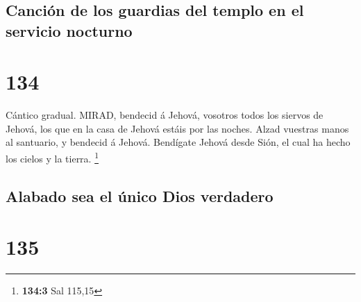 \hypertarget{canciuxf3n-de-los-guardias-del-templo-en-el-servicio-nocturno}{%
\subsection{Canción de los guardias del templo en el servicio
nocturno}\label{canciuxf3n-de-los-guardias-del-templo-en-el-servicio-nocturno}}

\hypertarget{section-133}{%
\section{134}\label{section-133}}

 Cántico gradual. MIRAD, bendecid á Jehová, vosotros todos
los siervos de Jehová, los que en la casa de Jehová estáis por las
noches.  Alzad vuestras manos al santuario, y bendecid á
Jehová.  Bendígate Jehová desde Sión, el cual ha hecho los
cielos y la tierra. \footnote{\textbf{134:3} Sal 115,15}

\hypertarget{alabado-sea-el-uxfanico-dios-verdadero}{%
\subsection{Alabado sea el único Dios
verdadero}\label{alabado-sea-el-uxfanico-dios-verdadero}}

\hypertarget{section-134}{%
\section{135}\label{section-134}}

